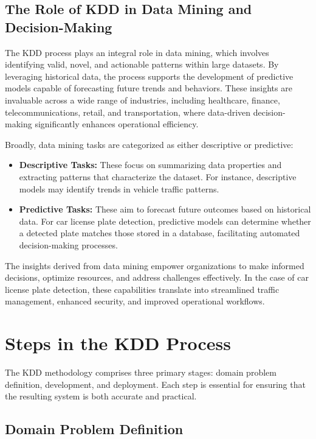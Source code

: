 \subsection{The Role of KDD in Data Mining and Decision-Making}

The KDD process plays an integral role in data mining, which involves identifying valid, novel, and actionable patterns within large datasets. By leveraging historical data, the process supports the development of predictive models capable of forecasting future trends and behaviors. These insights are invaluable across a wide range of industries, including healthcare, finance, telecommunications, retail, and transportation, where data-driven decision-making significantly enhances operational efficiency.

Broadly, data mining tasks are categorized as either descriptive or predictive:
\begin{itemize}
\item \textbf{Descriptive Tasks:} These focus on summarizing data properties and extracting patterns that characterize the dataset. For instance, descriptive models may identify trends in vehicle traffic patterns.
\item \textbf{Predictive Tasks:} These aim to forecast future outcomes based on historical data. For car license plate detection, predictive models can determine whether a detected plate matches those stored in a database, facilitating automated decision-making processes.
\end{itemize}

The insights derived from data mining empower organizations to make informed decisions, optimize resources, and address challenges effectively. In the case of car license plate detection, these capabilities translate into streamlined traffic management, enhanced security, and improved operational workflows.

\section{Steps in the KDD Process}

The KDD methodology comprises three primary stages: domain problem definition, development, and deployment. Each step is essential for ensuring that the resulting system is both accurate and practical.

\subsection{Domain Problem Definition}

